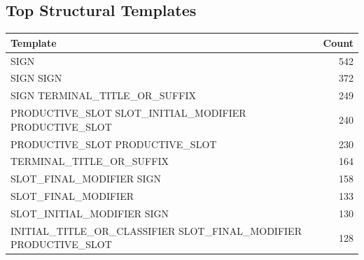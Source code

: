 \documentclass[11pt,a4paper]{article}
\begin{document}
\subsection*{Top Structural Templates}
\begin{center}
\begin{tabular}{p{}r}
\toprule
\textbf{Template} & \textbf{Count} \\
\midrule
SIGN & 542 \\
SIGN SIGN & 372 \\
SIGN TERMINAL\_TITLE\_OR\_SUFFIX & 249 \\
PRODUCTIVE\_SLOT SLOT\_INITIAL\_MODIFIER PRODUCTIVE\_SLOT & 240 \\
PRODUCTIVE\_SLOT PRODUCTIVE\_SLOT & 230 \\
TERMINAL\_TITLE\_OR\_SUFFIX & 164 \\
SLOT\_FINAL\_MODIFIER SIGN & 158 \\
SLOT\_FINAL\_MODIFIER & 133 \\
SLOT\_INITIAL\_MODIFIER SIGN & 130 \\
INITIAL\_TITLE\_OR\_CLASSIFIER SLOT\_FINAL\_MODIFIER PRODUCTIVE\_SLOT & 128 \\
\bottomrule
\end{tabular}
\end{center}
\end{document}
